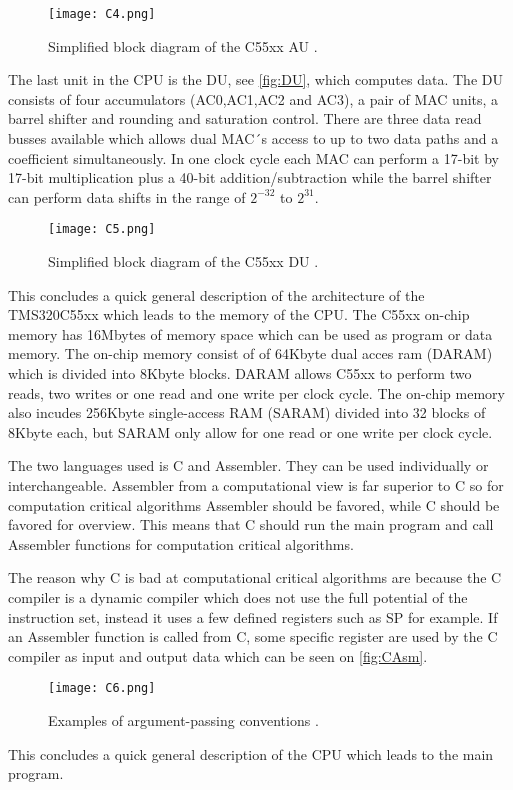 \begin{figure}[H]
\centering
\texttt{[image: C4.png]}
\caption{Simplified block diagram of the C55xx AU \citep{signalProcessBook}.}
\label{fig:AU}
\end{figure}
The last unit in the CPU is the DU, see \autoref{fig:DU}, which computes data. The DU consists of four accumulators (AC0,AC1,AC2 and AC3), a pair of MAC units, a barrel shifter and rounding and saturation control. There are three data read busses available which allows dual MAC´s access to up to two data paths and a coefficient simultaneously. In one clock cycle each MAC can perform a 17-bit by 17-bit multiplication plus a 40-bit addition/subtraction while the barrel shifter can perform data shifts in the range of $2^{-32}$ to $2^{31}$. 
\begin{figure}[H]
\centering
\texttt{[image: C5.png]}
\caption{Simplified block diagram of the C55xx DU \citep{signalProcessBook}.}
\label{fig:DU}
\end{figure}
This concludes a quick general description of the architecture of the TMS320C55xx which leads to the memory of the CPU. The C55xx on-chip memory has 16Mbytes of memory space which can be used as program or data memory. The on-chip memory consist of of 64Kbyte dual acces ram (DARAM) which is divided into 8Kbyte blocks. DARAM allows C55xx to perform two reads, two writes or one read and one write per clock cycle. The on-chip memory also incudes 256Kbyte single-access RAM (SARAM) divided into 32 blocks of 8Kbyte each, but SARAM only allow for one read or one write per clock cycle.

The two languages used is C and Assembler. They can be used individually or interchangeable. Assembler from a computational view is far superior to C so for computation critical algorithms Assembler should be favored, while C should be favored for overview. This means that C should run the main program and call Assembler functions for computation critical algorithms. 

The reason why C is bad at computational critical algorithms are because the C compiler is a dynamic compiler which does not use the full potential of the instruction set, instead it uses a few defined registers such as SP for example. If an Assembler function is called from C, some specific register are used by the C compiler as input and output data which can be seen on \autoref{fig:CAsm}.
\begin{figure}[H]
\centering
\texttt{[image: C6.png]}
\caption{Examples of argument-passing conventions \citep{signalProcessBook}.}
\label{fig:CAsm}
\end{figure}
This concludes a quick general description of the CPU which leads to the main program.
